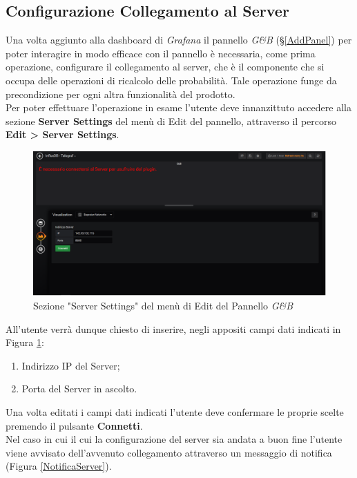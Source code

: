 \subsection{Configurazione Collegamento al Server}\label{CCS}

Una volta aggiunto alla dashboard di \textit{Grafana} il pannello \textit{G\&B} (§\ref{AddPanel}) per poter interagire in modo efficace con il pannello è necessaria, come prima operazione, configurare il collegamento al server, che è il componente che si occupa delle operazioni di ricalcolo delle probabilità. Tale operazione funge da precondizione per ogni altra funzionalità del prodotto.\\
Per poter effettuare l'operazione in esame l'utente deve innanzittuto accedere alla sezione \textbf{Server Settings} del menù di Edit del pannello, attraverso il percorso \textbf{Edit > Server Settings}.

\begin{figure}[H]
	\begin{center}
		\includegraphics[scale=0.35]{./images/ServerSettings.png}
		 \caption{Sezione "Server Settings" del menù di Edit del Pannello \textit{G\&B}}	
		 \label{ServerSettings}
	\end{center}
\end{figure}

All'utente verrà dunque chiesto di inserire, negli appositi campi dati indicati in Figura \ref{ServerSettings}:
\begin{enumerate}
	\item Indirizzo IP del Server;
	\item Porta del Server in ascolto.
\end{enumerate}
Una volta editati i campi dati indicati l'utente deve confermare le proprie scelte premendo il pulsante \textbf{Connetti}.\\
Nel caso in cui il cui la configurazione del server sia andata a buon fine l'utente viene avvisato dell'avvenuto collegamento attraverso un messaggio di notifica (Figura \ref{NotificaServer}).

